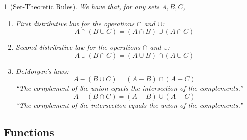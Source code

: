 \documentclass[12pt]{article}
\theoremstyle{plain}
\newtheorem{theorem}{\color{ForestGreen}{\textbf{Theorem}}}[section]
\theoremstyle{definition}
\newcommand{\1}{\mathbbm 1}
\begin{document}
\begin{theorem}[Set-Theoretic Rules]
	We have that, for any sets $A, B, C$,
	\begin{enumerate}
		\item First distributive law for the operations $\cap$ and $\cup$:
		\begin{equation}
			A \cap (B \cup C) = (A \cap B) \cup (A \cap C)
		\end{equation}
		\item Second distributive law for the operations $\cap$ and $\cup$:
		\begin{equation}
			A \cup (B \cap C) = (A \cup B) \cap (A \cup C)
		\end{equation}
		\item DeMorgan's laws:
		\begin{equation}
			A - (B \cup C) = (A - B) \cap (A - C)
		\end{equation}
		``The complement of the union equals the intersection of the complements.''
		\begin{equation}
			A - (B \cap C) = (A - B) \cup (A - C)
		\end{equation}
		``The complement of the intersection equals the union of the complements.''
	\end{enumerate}
\end{theorem}

\subsection{Functions}
\end{document}
